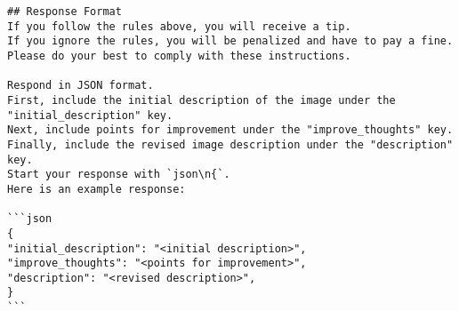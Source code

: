 \begin{lstlisting}
## Response Format  
If you follow the rules above, you will receive a tip.  
If you ignore the rules, you will be penalized and have to pay a fine.  
Please do your best to comply with these instructions.

Respond in JSON format.  
First, include the initial description of the image under the "initial_description" key.  
Next, include points for improvement under the "improve_thoughts" key.  
Finally, include the revised image description under the "description" key.  
Start your response with `json\n{`.  
Here is an example response:

```json
{
"initial_description": "<initial description>",
"improve_thoughts": "<points for improvement>",
"description": "<revised description>",
}
```

\end{lstlisting}

